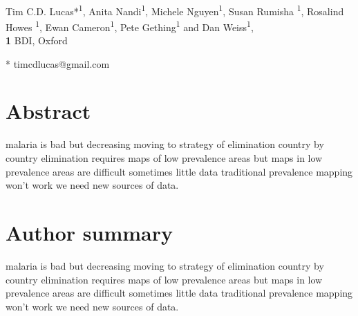 \documentclass[10pt,letterpaper]{article}
\begin{document}
\vspace*{0.2in}

\begin{flushleft}
{\Large
\textbf{} %
}
\newline
\\
Tim C.D. Lucas*\textsuperscript{1}, Anita Nandi\textsuperscript{1}, Michele Nguyen\textsuperscript{1}, Susan Rumisha \textsuperscript{1}, Rosalind Howes \textsuperscript{1}, Ewan Cameron\textsuperscript{1}, Pete Gething\textsuperscript{1} and Dan Weiss\textsuperscript{1},
\\
\bigskip
\textbf{1} BDI, Oxford
\\
\bigskip

% 
%




* timcdlucas@gmail.com

\end{flushleft}
\section*{Abstract}
malaria is bad but decreasing
moving to strategy of elimination country by country
elimination requires maps of low prevalence areas
but maps in low prevalence areas are difficult
sometimes little data
traditional prevalence mapping won't work
we need new sources of data.



\section*{Author summary}
malaria is bad but decreasing
moving to strategy of elimination country by country
elimination requires maps of low prevalence areas
but maps in low prevalence areas are difficult
sometimes little data
traditional prevalence mapping won't work
we need new sources of data.
\end{document}
